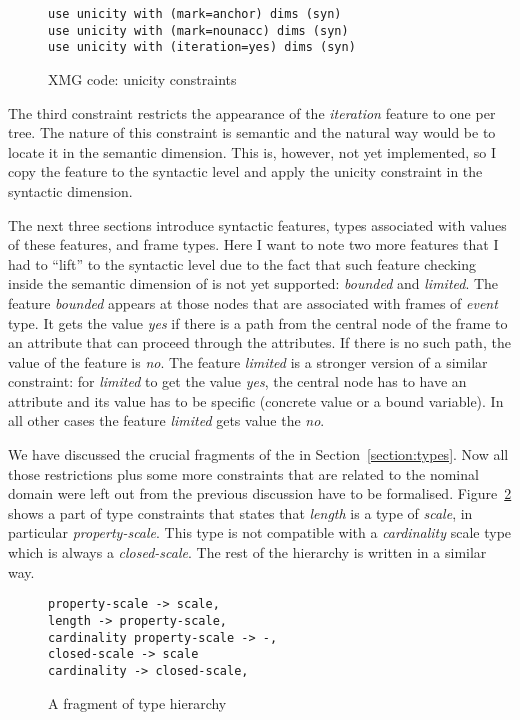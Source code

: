 \begin{figure}
\begin{lstlisting}[style=xmg]
use unicity with (mark=anchor) dims (syn)
use unicity with (mark=nounacc) dims (syn)
use unicity with (iteration=yes) dims (syn)
\end{lstlisting}
\caption{XMG code: unicity constraints \label{xmg:unicity}}
\end{figure}

The third constraint restricts the appearance of the \textit{iteration} feature to one per tree. The nature of this constraint is semantic and the natural way would be to locate it in the semantic dimension. This is, however, not yet implemented, so I copy the feature to the syntactic level and apply the unicity constraint in the syntactic dimension.

The next three sections introduce syntactic features, types associated with values of these features, and frame types. Here I want to note two more features that I had to ``lift'' to the syntactic level due to the fact that such feature checking inside the semantic dimension of  is not yet supported: \textit{bounded} and \textit{limited}. The feature \textit{bounded} appears at those nodes that are associated with frames of \textit{event} type. It gets the value \textit{yes} if there is a path from the central node of the frame to an attribute \FIN that can proceed through the \PARTOF attributes. If there is no such path, the value of the feature is \textit{no}. The feature \textit{limited} is a stronger version of a similar constraint: for \textit{limited} to get the value \textit{yes}, the central node has to have an attribute \FIN and its value has to be specific (concrete value or a bound variable). In all other cases the feature \textit{limited} gets value the \textit{no}.

We have discussed the crucial fragments of the  in Section~\ref{section:types}. Now all those restrictions plus some more constraints that are related to the nominal domain were left out from the previous discussion have to be formalised. Figure~\ref{xmg:types} shows a part of type constraints that states that \textit{length} is a type of \textit{scale}, in particular \textit{property-scale}. This type is not compatible with a \textit{cardinality} scale type which is always a \textit{closed-scale}. The rest of the hierarchy is written in a similar way.

\begin{figure}
\begin{lstlisting}[style=xmg]
property-scale -> scale,
length -> property-scale,
cardinality property-scale -> -,
closed-scale -> scale
cardinality -> closed-scale,
\end{lstlisting}
\caption{A fragment of type hierarchy \label{xmg:types}}
\end{figure}

